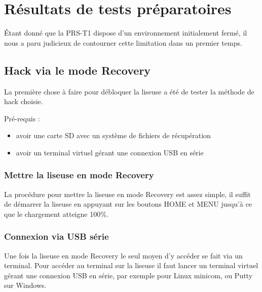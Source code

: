 \chapter{Résultats de tests préparatoires}

Étant donné que la PRS-T1 dispose d'un environnement initialement fermé, il nous a paru judicieux de contourner cette limitation dans un premier temps.

\section{Hack via le mode Recovery}

La première chose à faire pour débloquer la liseuse a été de tester la méthode de hack choisie.

Pré-requis : 
\begin{itemize}
	\item avoir une carte SD avec un système de fichiers de récupération 
	\item avoir un terminal virtuel gérant une connexion USB en série
\end{itemize}

\subsection{Mettre la liseuse en mode Recovery}

La procédure pour mettre la liseuse en mode Recovery est assez simple, il suffit de démarrer la liseuse en appuyant sur les boutons HOME et MENU jusqu'à ce que le chargement atteigne 100\%. 

\subsection{Connexion via USB série}

Une fois la liseuse en mode Recovery le seul moyen d'y accéder se fait via un terminal.
Pour accéder au terminal sur la liseuse il faut lancer un terminal virtuel gérant une connexion USB en série, par exemple pour Linux minicom, ou Putty sur Windows.

